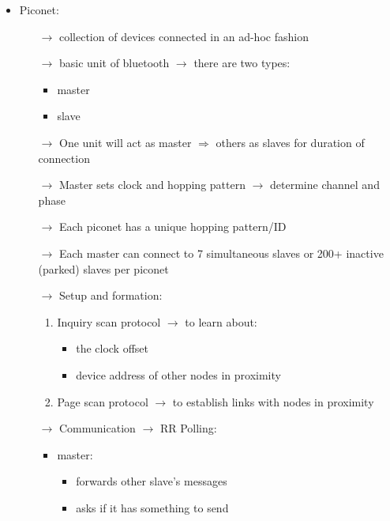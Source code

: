 \begin{itemize}
    \item Piconet:
    \begin{itemize}
        \item[$\rightarrow$] collection of devices connected in an ad-hoc fashion
        \item[$\rightarrow$] basic unit of bluetooth $\rightarrow$ there are two types:
        \begin{itemize}
            \item master
            \item slave
        \end{itemize} 
        \item[$\rightarrow$] One unit will act as master $\Rightarrow$ others as slaves for duration of connection
        \item[$\rightarrow$] Master sets clock and hopping pattern $\rightarrow$ determine channel and phase
        \item[$\rightarrow$] Each piconet has a unique hopping pattern/ID
        \item[$\rightarrow$] Each master can connect to 7 simultaneous slaves or 200+
        inactive\\(parked) slaves per piconet
        \item[$\rightarrow$] Setup and formation:
        \begin{enumerate}
            \item Inquiry scan protocol $\rightarrow$ to learn about:
            \begin{itemize}
                \item the clock offset
                \item device address of other nodes in proximity 
            \end{itemize}
            \item Page scan protocol $\rightarrow$ to establish links with nodes in proximity
        \end{enumerate}
        \newpage
        \item[$\rightarrow$] Communication $\rightarrow$ RR Polling:
        \begin{itemize}
            \item master:
            \begin{itemize}
                \item forwards other slave's messages
                \item asks if it has something to send

\end{itemize}
\end{itemize}
\end{itemize}
\end{itemize}
